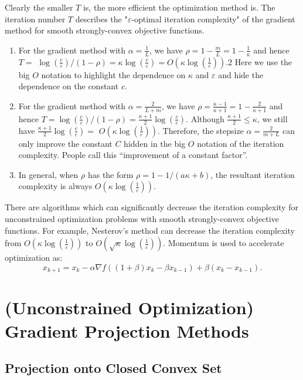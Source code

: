 \documentclass[11pt]{elegantbook}
\begin{document}
Clearly the smaller $T$ is, the more efficient the optimization method is. The iteration number $T$ describes the "$\varepsilon$-optimal iteration complexity" of the gradient method for smooth strongly-convex objective functions.
\begin{enumerate}[$\bullet$]
    \item For the gradient method with $\alpha=\frac{1}{L}$, we have $\rho=1-\frac{m}{L}=1-\frac{1}{\kappa}$ and hence $T=$ $\log \left(\frac{c}{\varepsilon}\right) /(1-\rho)=\kappa \log \left(\frac{c}{\varepsilon}\right)=O\left(\kappa \log \left(\frac{1}{\varepsilon}\right)\right) .2$ Here we use the big $O$ notation to highlight the dependence on $\kappa$ and $\varepsilon$ and hide the dependence on the constant $c$.
    \item For the gradient method with $\alpha=\frac{2}{L+m}$, we have $\rho=\frac{\kappa-1}{\kappa+1}=1-\frac{2}{\kappa+1}$ and hence $T=\log \left(\frac{c}{\varepsilon}\right) /(1-\rho)=\frac{\kappa+1}{2} \log \left(\frac{c}{\varepsilon}\right) .$ Although $\frac{\kappa+1}{2} \leq \kappa$, we still have $\frac{\kappa+1}{2} \log \left(\frac{c}{\varepsilon}\right)=$ $O\left(\kappa \log \left(\frac{1}{\varepsilon}\right)\right)$. Therefore, the stepsize $\alpha=\frac{2}{m+L}$ can only improve the constant $C$ hidden in the big $O$ notation of the iteration complexity. People call this “improvement of a constant factor”.
    \item In general, when $\rho$ has the form $\rho=1-1 /(a \kappa+b)$, the resultant iteration complexity is always $O\left(\kappa \log \left(\frac{1}{\varepsilon}\right)\right)$.
\end{enumerate}

There are algorithms which can significantly decrease the iteration complexity for unconstrained optimization problems with smooth strongly-convex objective functions. For example, Nesterov's method can decrease the iteration complexity from $O\left(\kappa \log \left(\frac{1}{\varepsilon}\right)\right)$ to $O\left(\sqrt{\kappa} \log \left(\frac{1}{\varepsilon}\right)\right)$. Momentum is used to accelerate optimization as:
$$
x_{k+1}=x_{k}-\alpha \nabla f\left((1+\beta) x_{k}-\beta x_{k-1}\right)+\beta\left(x_{k}-x_{k-1}\right) .
$$

\chapter{(Unconstrained Optimization) Gradient Projection Methods}
\section{Projection onto Closed Convex Set}
\end{document}
